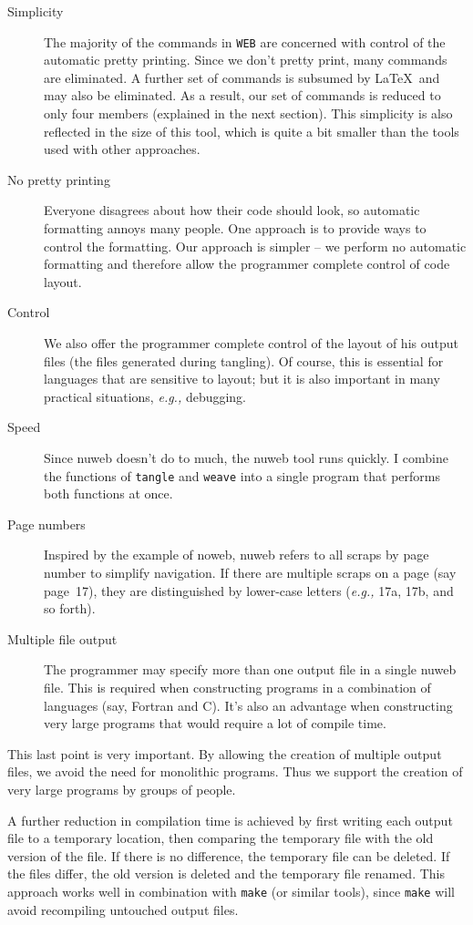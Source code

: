 \begin{description}
\item[Simplicity] The majority of the commands in \verb|WEB| are
  concerned with control of the automatic pretty printing. Since we
  don't pretty print, many commands are eliminated. A further set of
  commands is subsumed by \LaTeX\  and may also be eliminated. As a
  result, our set of commands is reduced to only four members (explained
  in the next section). This simplicity is also reflected in
  the size of this tool, which is quite a bit smaller than the tools
  used with other approaches.
\item[No pretty printing] Everyone disagrees about how their code
  should look, so automatic formatting annoys many people. One approach
  is to provide ways to control the formatting. Our approach is simpler
  -- we perform no automatic formatting and therefore allow the
  programmer complete control of code layout.
\item[Control] We also offer the programmer complete control of the
  layout of his output files (the files generated during tangling). Of
  course, this is essential for languages that are sensitive to layout;
  but it is also important in many practical situations, {\em e.g.,}
  debugging.
\item[Speed] Since nuweb doesn't do to much, the nuweb tool runs
  quickly. I combine the functions of \verb|tangle| and \verb|weave| into
  a single program that performs both functions at once.
\item[Page numbers] Inspired by the example of noweb, nuweb refers to
  all scraps by page number to simplify navigation. If there are
  multiple scraps on a page (say page~17), they are distinguished by
  lower-case letters ({\em e.g.,} 17a, 17b, and so forth).
\item[Multiple file output] The programmer may specify more than one
  output file in a single nuweb file. This is required when constructing
  programs in a combination of languages (say, Fortran and C)\@. It's also
  an advantage when constructing very large programs that would require
  a lot of compile time.
\end{description}
This last point is very important. By allowing the creation of
multiple output files, we avoid the need for monolithic programs.
Thus we support the creation of very large programs by groups of
people. 

A further reduction in compilation time is achieved by first
writing each output file to a temporary location, then comparing the
temporary file with the old version of the file. If there is no
difference, the temporary file can be deleted. If the files differ,
the old version is deleted and the temporary file renamed. This
approach works well in combination with \verb|make| (or similar tools),
since \verb|make| will avoid recompiling untouched output files.


